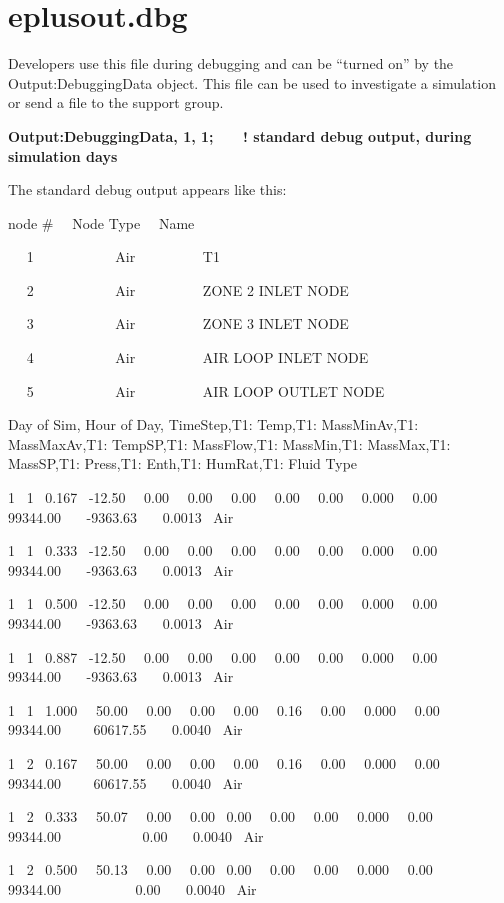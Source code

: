 \section{eplusout.dbg}\label{eplusout.dbg}

Developers use this file during debugging and can be ``turned on'' by the Output:DebuggingData object. This file can be used to investigate a simulation or send a file to the support group.

\textbf{Output:DebuggingData, 1, 1;~~~ ! standard debug output, during simulation days}

The standard debug output appears like this:

node \#~~ Node Type~~ Name

 ~~ 1~~~~~~~~~~~ Air~~~~~~~~~ T1

 ~~ 2~~~~~~~~~~~ Air~~~~~~~~~ ZONE 2 INLET NODE

 ~~ 3~~~~~~~~~~~ Air~~~~~~~~~ ZONE 3 INLET NODE

 ~~ 4~~~~~~~~~~~ Air~~~~~~~~~ AIR LOOP INLET NODE

 ~~ 5~~~~~~~~~~~ Air~~~~~~~~~ AIR LOOP OUTLET NODE

Day of Sim, Hour of Day, TimeStep,T1: Temp,T1: MassMinAv,T1: MassMaxAv,T1: TempSP,T1: MassFlow,T1: MassMin,T1: MassMax,T1: MassSP,T1: Press,T1: Enth,T1: HumRat,T1: Fluid Type

1~ 1~ 0.167~ -12.50~~ 0.00~~ 0.00~~ 0.00~~ 0.00~~ 0.00~~ 0.000~~ 0.00~~ 99344.00~~~ -9363.63~~~ 0.0013~ Air

1~ 1~ 0.333~ -12.50~~ 0.00~~ 0.00~~ 0.00~~ 0.00~~ 0.00~~ 0.000~~ 0.00~~ 99344.00~~~ -9363.63~~~ 0.0013~ Air

1~ 1~ 0.500~ -12.50~~ 0.00~~ 0.00~~ 0.00~~ 0.00~~ 0.00~~ 0.000~~ 0.00~~ 99344.00~~~ -9363.63~~~ 0.0013~ Air

1~ 1~ 0.887~ -12.50~~ 0.00~~ 0.00~~ 0.00~~ 0.00~~ 0.00~~ 0.000~~ 0.00~~ 99344.00~~~ -9363.63~~~ 0.0013~ Air

1~ 1~ 1.000~~ 50.00~~ 0.00~~ 0.00~~ 0.00~~ 0.16~~ 0.00~~ 0.000~~ 0.00~~ 99344.00~~~~ 60617.55~~~ 0.0040~ Air

1~ 2~ 0.167~~ 50.00~~ 0.00~~ 0.00~~ 0.00~~ 0.16~~ 0.00~~ 0.000~~ 0.00~~ 99344.00~~~~ 60617.55~~~ 0.0040~ Air

1~ 2~ 0.333~~ 50.07~~ 0.00~~ 0.00~ 0.00~~ 0.00~~ 0.00~~ 0.000~~ 0.00~~ 99344.00~~~~~~~~~~~ 0.00~~~ 0.0040~ Air

1~ 2~ 0.500~~ 50.13~~ 0.00~~ 0.00~ 0.00~~ 0.00~~ 0.00~~ 0.000~~ 0.00~~ 99344.00~~~~~~~~~~ 0.00~~~ 0.0040~ Air

